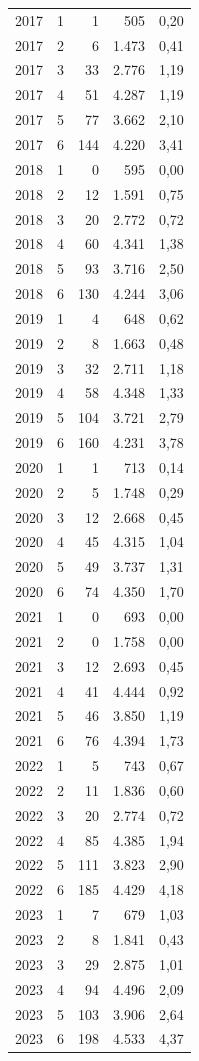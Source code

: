 \begin{longtable}{lrrrr}
2017 & 1 & 1 & 505 & 0,20 \\
2017 & 2 & 6 & 1.473 & 0,41 \\
2017 & 3 & 33 & 2.776 & 1,19 \\
2017 & 4 & 51 & 4.287 & 1,19 \\
2017 & 5 & 77 & 3.662 & 2,10 \\
2017 & 6 & 144 & 4.220 & 3,41 \\
2018 & 1 & 0 & 595 & 0,00 \\
2018 & 2 & 12 & 1.591 & 0,75 \\
2018 & 3 & 20 & 2.772 & 0,72 \\
2018 & 4 & 60 & 4.341 & 1,38 \\
2018 & 5 & 93 & 3.716 & 2,50 \\
2018 & 6 & 130 & 4.244 & 3,06 \\
2019 & 1 & 4 & 648 & 0,62 \\
2019 & 2 & 8 & 1.663 & 0,48 \\
2019 & 3 & 32 & 2.711 & 1,18 \\
2019 & 4 & 58 & 4.348 & 1,33 \\
2019 & 5 & 104 & 3.721 & 2,79 \\
2019 & 6 & 160 & 4.231 & 3,78 \\
2020 & 1 & 1 & 713 & 0,14 \\
2020 & 2 & 5 & 1.748 & 0,29 \\
2020 & 3 & 12 & 2.668 & 0,45 \\
2020 & 4 & 45 & 4.315 & 1,04 \\
2020 & 5 & 49 & 3.737 & 1,31 \\
2020 & 6 & 74 & 4.350 & 1,70 \\
2021 & 1 & 0 & 693 & 0,00 \\
2021 & 2 & 0 & 1.758 & 0,00 \\
2021 & 3 & 12 & 2.693 & 0,45 \\
2021 & 4 & 41 & 4.444 & 0,92 \\
2021 & 5 & 46 & 3.850 & 1,19 \\
2021 & 6 & 76 & 4.394 & 1,73 \\
2022 & 1 & 5 & 743 & 0,67 \\
2022 & 2 & 11 & 1.836 & 0,60 \\
2022 & 3 & 20 & 2.774 & 0,72 \\
2022 & 4 & 85 & 4.385 & 1,94 \\
2022 & 5 & 111 & 3.823 & 2,90 \\
2022 & 6 & 185 & 4.429 & 4,18 \\
2023 & 1 & 7 & 679 & 1,03 \\
2023 & 2 & 8 & 1.841 & 0,43 \\
2023 & 3 & 29 & 2.875 & 1,01 \\
2023 & 4 & 94 & 4.496 & 2,09 \\
2023 & 5 & 103 & 3.906 & 2,64 \\
2023 & 6 & 198 & 4.533 & 4,37 \\
\end{longtable}
